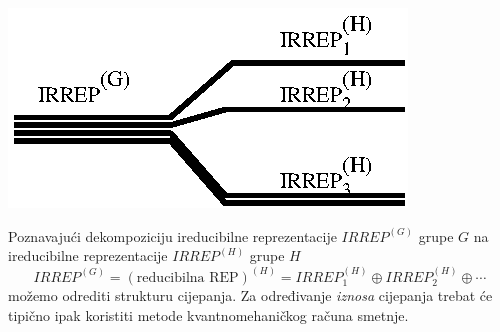 \centerline{\includegraphics[scale=1.0]{pics/splitting.eps}}
 
Poznavajući dekompoziciju ireducibilne reprezentacije $IRREP^{(G)}$
grupe $G$ na ireducibilne reprezentacije  $IRREP^{(H)}$ grupe $H$
\begin{displaymath}
   IRREP^{(G)}=(\text{reducibilna REP})^{(H)}=
 IRREP^{(H)}_1 \oplus IRREP^{(H)}_2 \oplus \cdots
\end{displaymath}
možemo odrediti strukturu cijepanja. Za određivanje \emph{iznosa} cijepanja
trebat će tipično ipak koristiti metode kvantnomehaničkog računa smetnje.

